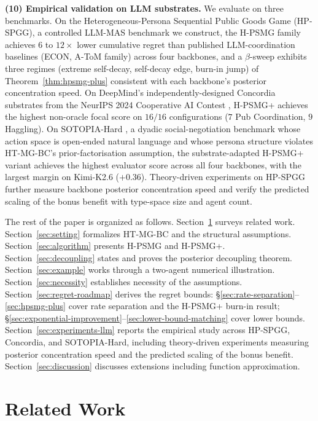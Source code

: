\documentclass{article}
\def\textsuperscript#1{#1}%
\begin{document}
\textbf{(10) Empirical validation on LLM substrates.} We evaluate on three benchmarks. On the Heterogeneous-Persona Sequential Public Goods Game (HP-SPGG), a controlled LLM-MAS benchmark we construct, the H-PSMG family achieves $6$ to $12\times$ lower cumulative regret than published LLM-coordination baselines (ECON, A-ToM family) across four backbones, and a $\beta$-sweep exhibits three regimes (extreme self-decay, self-decay edge, burn-in jump) of Theorem~\ref{thm:hpsmg-plus} consistent with each backbone's posterior concentration speed. On DeepMind's independently-designed Concordia substrates from the NeurIPS 2024 Cooperative AI Contest \citep{vezhnevets2023concordia, concordia_contest2025}, H-PSMG\textsuperscript{+} achieves the highest non-oracle focal score on $16/16$ configurations ($7$ Pub Coordination, $9$ Haggling). On SOTOPIA-Hard \citep{zhou2024sotopia}, a dyadic social-negotiation benchmark whose action space is open-ended natural language and whose persona structure violates HT-MG-BC's prior-factorisation assumption, the substrate-adapted H-PSMG\textsuperscript{+} variant achieves the highest evaluator score across all four backbones, with the largest margin on Kimi-K2.6 ($+0.36$). Theory-driven experiments on HP-SPGG further measure backbone posterior concentration speed and verify the predicted scaling of the bonus benefit with type-space size and agent count.

The rest of the paper is organized as follows. Section~\ref{sec:related} surveys related work. Section~\ref{sec:setting} formalizes HT-MG-BC and the structural assumptions. Section~\ref{sec:algorithm} presents H-PSMG and H-PSMG\textsuperscript{+}. Section~\ref{sec:decoupling} states and proves the posterior decoupling theorem. Section~\ref{sec:example} works through a two-agent numerical illustration. Section~\ref{sec:necessity} establishes necessity of the assumptions. Section~\ref{sec:regret-roadmap} derives the regret bounds: §\ref{sec:rate-separation}--\ref{sec:hpsmg-plus} cover rate separation and the H-PSMG\textsuperscript{+} burn-in result; §\ref{sec:exponential-improvement}--\ref{sec:lower-bound-matching} cover lower bounds. Section~\ref{sec:experiments-llm} reports the empirical study across HP-SPGG, Concordia, and SOTOPIA-Hard, including theory-driven experiments measuring posterior concentration speed and the predicted scaling of the bonus benefit. Section~\ref{sec:discussion} discusses extensions including function approximation.

\section{Related Work}
\label{sec:related}
\end{document}
